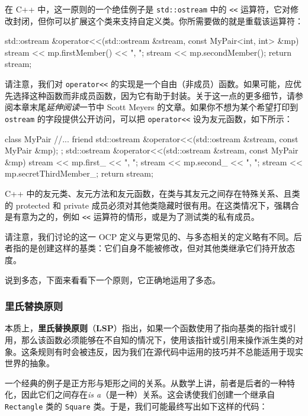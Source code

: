 在 C++ 中，这一原则的一个绝佳例子是 \texttt{std::\allowbreak{}ostream} 中的 \texttt{<<} 运算符，它对修改封闭，但你可以扩展这个类来支持自定义类。你所需要做的就是重载该运算符：

\begin{codebox}[cpp]
std::ostream &operator<<(std::ostream &stream, const MyPair<int, int> &mp)
{
    stream << mp.firstMember() << ", ";
    stream << mp.secondMember();
    return stream;
}
\end{codebox}

请注意，我们对 \texttt{operator<<} 的实现是一个自由（非成员）函数。如果可能，应优先选择这种函数而非成员函数，因为它有助于封装。关于这一点的更多细节，请参阅本章末尾\emph{延伸阅读}一节中 Scott Meyers 的文章。如果你不想为某个希望打印到 \texttt{ostream} 的字段提供公开访问，可以把 \texttt{operator<<} 设为友元函数，如下所示：

\begin{codebox}[cpp]
class MyPair {
    //...
    friend std::ostream &operator<<(std::ostream &stream, const MyPair &mp);
};
std::ostream &operator<<(std::ostream &stream, const MyPair &mp) {
    stream << mp.first_ << ", ";
    stream << mp.second_ << ", ";
    stream << mp.secretThirdMember_;
    return stream;
}
\end{codebox}

C++ 中的友元类、友元方法和友元函数，在类与其友元之间存在特殊关系、且类的 protected 和 private 成员必须对其他类隐藏时很有用。在这类情况下，强耦合是有意为之的，例如 \texttt{<<} 运算符的情形，或是为了测试类的私有成员。

\label{idx:042}
请注意，我们讨论的这一 OCP 定义与更常见的、与多态相关的定义略有不同。后者指的是创建这样的基类：它们自身不能被修改，但对其他类继承它们持开放态度。

\label{idx:043}
说到多态，下面来看看下一个原则，它正确地运用了多态。

\subsubsection{里氏替换原则}

\label{idx:044}
\label{idx:045}
本质上，\textbf{里氏替换原则}（\textbf{LSP}）指出，如果一个函数使用了指向基类的指针或引用，那么该函数必须能够在不自知的情况下，使用该指针或引用来操作派生类的对象。这条规则有时会被违反，因为我们在源代码中运用的技巧并不总能适用于现实世界的抽象。

一个经典的例子是正方形与矩形之间的关系。从数学上讲，前者是后者的一种特化，因此它们之间存在\emph{is a}（是一种）关系。这会诱使我们创建一个继承自 \texttt{Rectangle} 类的 \texttt{Square} 类。于是，我们可能最终写出如下这样的代码：

